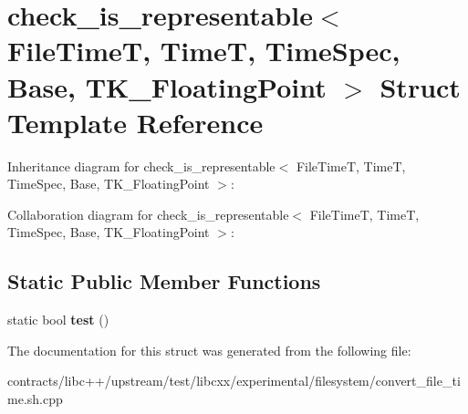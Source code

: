 \hypertarget{structcheck__is__representable_3_01_file_time_t_00_01_time_t_00_01_time_spec_00_01_base_00_01_t_k___floating_point_01_4}{}\section{check\+\_\+is\+\_\+representable$<$ File\+TimeT, TimeT, Time\+Spec, Base, T\+K\+\_\+\+Floating\+Point $>$ Struct Template Reference}
\label{structcheck__is__representable_3_01_file_time_t_00_01_time_t_00_01_time_spec_00_01_base_00_01_t_k___floating_point_01_4}


Inheritance diagram for check\+\_\+is\+\_\+representable$<$ File\+TimeT, TimeT, Time\+Spec, Base, T\+K\+\_\+\+Floating\+Point $>$\+:


Collaboration diagram for check\+\_\+is\+\_\+representable$<$ File\+TimeT, TimeT, Time\+Spec, Base, T\+K\+\_\+\+Floating\+Point $>$\+:
\subsection*{Static Public Member Functions}
\begin{DoxyCompactItemize}
\item 
\mbox{\label{structcheck__is__representable_3_01_file_time_t_00_01_time_t_00_01_time_spec_00_01_base_00_01_t_k___floating_point_01_4_aeff89ae7ec91144a8687d80c039c1e4b}} 
static bool {\bfseries test} ()
\end{DoxyCompactItemize}


The documentation for this struct was generated from the following file\+:\begin{DoxyCompactItemize}
\item 
contracts/libc++/upstream/test/libcxx/experimental/filesystem/convert\+\_\+file\+\_\+time.\+sh.\+cpp\end{DoxyCompactItemize}
